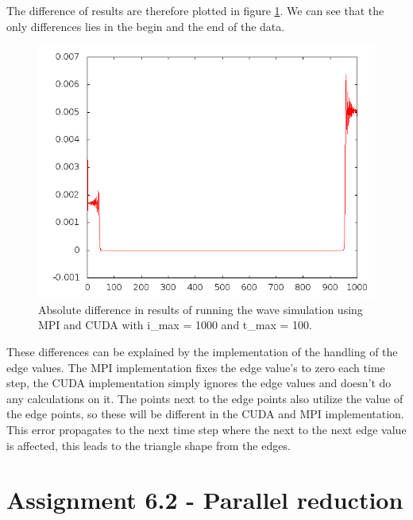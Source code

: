\documentclass[a4paper]{article}
\begin{document}
		\noindent The difference of results are therefore plotted in figure \ref{fig:resultsDiff}.
		We can see that the only differences lies in the begin and the end of the data.
		
		\begin{figure}[H]
			\begin{center}
				\includegraphics[scale=0.5]{results_diff}
			\end{center}
			\caption{Absolute difference in results of running the wave simulation using MPI and CUDA with i\_max = 1000 and t\_max = 100.}
			\label{fig:resultsDiff}
		\end{figure}
		
		\noindent These differences can be explained by the implementation of the handling of the edge values.
		The MPI implementation fixes the edge value's to zero each time step, the CUDA implementation simply ignores the edge values and doesn't do any calculations on it.
		The points next to the edge points also utilize the value of the edge points, so these will be different in the CUDA and MPI implementation.
		This error propagates to the next time step where the next to the next edge value is affected, this leads to the triangle shape from the edges.
		

	

\section{Assignment 6.2 - Parallel reduction}
\end{document}
